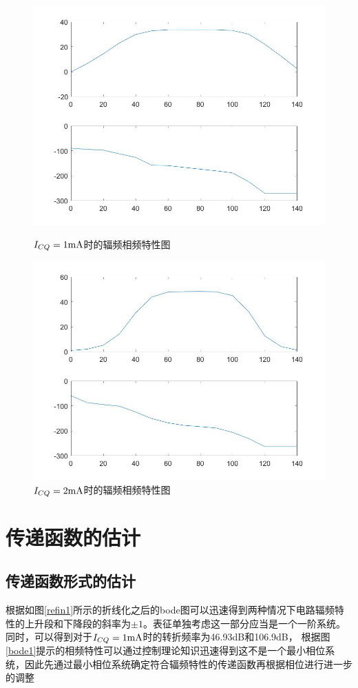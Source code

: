 \documentclass[UTF8,a4paper]{paper}
\begin{document}
\begin{figure}
\centering
\includegraphics[width=\textwidth]{bode1exp.jpg}
\caption{$I_{CQ}=1\rm{mA}$时的辐频相频特性图}
\label{bode1}
\includegraphics[width=\textwidth]{bode2exp.jpg}
\caption{$I_{CQ}=2\rm{mA}$时的辐频相频特性图}
\label{bode2}
\end{figure}
\section{传递函数的估计}
\subsection{传递函数形式的估计}
根据如图\ref{refin1}所示的折线化之后的bode图可以迅速得到两种情况下电路辐频特性的上升段和下降段的斜率为$\pm1$。表征单独考虑这一部分应当是一个一阶系统。同时，可以得到对于$I_{CQ}=1\rm{mA}$时的转折频率为46.93dB和106.9dB，
根据图\ref{bode1}提示的相频特性可以通过控制理论知识迅速得到这不是一个最小相位系统，因此先通过最小相位系统确定符合辐频特性的传递函数再根据相位进行进一步的调整
\end{document}
